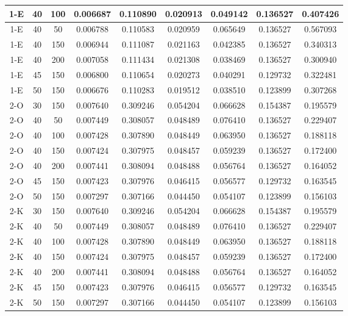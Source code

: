 \begin{center}
\begin{longtable}{|c|c|c|c|c|c|c|c|c|}
	\hline \rowcolor{acceptable} 1-E &	40 &	100 &	0.006687 &	0.110890 &	0.020913 &	0.049142 &	0.136527 &	0.407426 \\
	\hline 1-E &	40 &	50  &	0.006788 &	0.110583 &	0.020959 &	0.065649 &	0.136527 &	0.567093 \\
	\hline \rowcolor{acceptable} 1-E &	40 &	150 &	0.006944 &	0.111087 &	0.021163 &	0.042385 &	0.136527 &	0.340313 \\
	\hline \rowcolor{acceptable} 1-E &	40 &	200 &	0.007058 &	0.111434 &	0.021308 &	0.038469 &	0.136527 &	0.300940 \\
	\hline 1-E &	45 &	150 &	0.006800 &	0.110654 &	0.020273 &	0.040291 &	0.129732 &	0.322481 \\
	\hline \rowcolor{acceptable} 1-E &	50 &	150 &	0.006676 &	0.110283 &	0.019512 &	0.038510 &	0.123899 &	0.307268 \\	
	\hline 2-O &	30 &	150 &	0.007640 &	0.309246 &	0.054204 &	0.066628 &	0.154387 &	0.195579 \\
	\hline 2-O &	40 &	50	&	0.007449 &	0.308057 &	0.048489 &	0.076410 &	0.136527 &	0.229407 \\
	\hline 2-O &	40 &	100	&	0.007428 &	0.307890 &	0.048449 &	0.063950 &	0.136527 &	0.188118 \\
	\hline 2-O &	40 &	150	& 	0.007424 &	0.307975 &	0.048457 &	0.059239 &	0.136527 &	0.172400 \\
	\hline 2-O &	40 &	200	&	0.007441 &	0.308094 &	0.048488 &	0.056764 &	0.136527 &	0.164052 \\
	\hline 2-O &	45 &	150	&	0.007423 &	0.307976 &	0.046415 &	0.056577 &	0.129732 &	0.163545 \\
	\hline 2-O &	50 &	150	&	0.007297 &	0.307166 &	0.044450 &	0.054107 &	0.123899 &	0.156103 \\
	\hline 2-K &	30 &	150	&	0.007640 &	0.309246 &	0.054204 &	0.066628 &	0.154387 &	0.195579 \\
	\hline 2-K &	40 &	50	&	0.007449 &	0.308057 &	0.048489 &	0.076410 &	0.136527 &	0.229407 \\
	\hline 2-K &	40 &	100	&	0.007428 &	0.307890 &	0.048449 &	0.063950 &	0.136527 &	0.188118 \\
	\hline 2-K &	40 &	150	&	0.007424 &	0.307975 &	0.048457 &	0.059239 &	0.136527 &	0.172400 \\
	\hline 2-K &	40 &	200	&	0.007441 &	0.308094 &	0.048488 &	0.056764 &	0.136527 &	0.164052 \\
	\hline 2-K &	45 &	150	&	0.007423 &	0.307976 &	0.046415 &	0.056577 &	0.129732 &	0.163545 \\
	\hline 2-K &	50 &	150	&	0.007297 &	0.307166 &	0.044450 &	0.054107 &	0.123899 &	0.156103 \\

\end{longtable}
\end{center}
